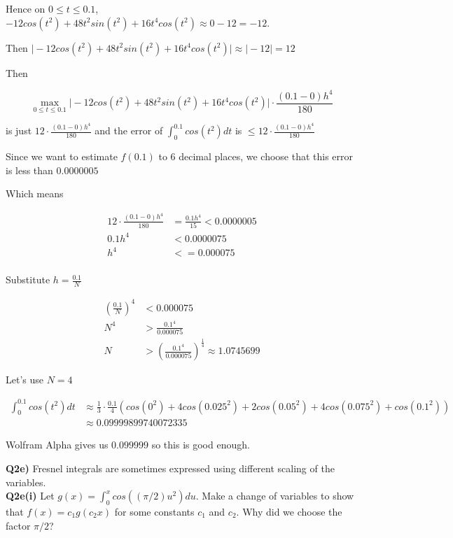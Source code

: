 \documentclass[9pt]{article}
\begin{document}
Hence on $0 \leq t \leq 0.1$, $-12cos(t^2) + 48t^2sin(t^2) + 16t^4cos(t^2) \approx 0 - 12 = -12$.

Then $\Big|-12cos(t^2) + 48t^2sin(t^2) + 16t^4cos(t^2) \Big| \approx \Big|-12\Big| = 12$

Then

\begin{equation*}
\max_{0 \leq t \leq 0.1} \Big| -12cos(t^2) + 48t^2sin(t^2) + 16t^4cos(t^2) \Big| \cdot \frac{(0.1 - 0)h^4}{180}
\end{equation*}

is just $12 \cdot \frac{(0.1 - 0)h^4}{180}$ and the error of $\int_0^{0.1} cos(t^2) dt$ is $\leq 12 \cdot \frac{(0.1 - 0)h^4}{180}$

Since we want to estimate $f(0.1)$ to 6 decimal places, we choose that this error is less than $0.0000005$

Which means

\begin{align*}
  12 \cdot \frac{(0.1 - 0)h^4}{180} &= \frac{0.1h^4}{15} < 0.0000005 \\
  0.1 h^4 &< 0.0000075 \\
  h^4 &<= 0.000075 \\
\end{align*}

Substitute $h = \frac{0.1}{N}$

\begin{align*}
  (\frac{0.1}{N})^4 &< 0.000075 \\
  N^4 &> \frac{0.1^4}{0.000075} \\
  N &> (\frac{0.1^4}{0.000075})^{\frac{1}{4}} \approx 1.0745699
\end{align*}

Let's use $N = 4$

\begin{align*}
  \int_{0}^{0.1} cos(t^2) dt &\approx \frac{1}{3} \cdot \frac{0.1}{4} (cos(0^2) + 4cos(0.025^2) + 2cos(0.05^2) + 4cos(0.075^2) + cos(0.1^2)) \\
  &\approx 0.09999899740072335
\end{align*}

Wolfram Alpha gives us $0.099999$ so this is good enough.


\begin{tcolorbox}
  \textbf{Q2e)} Fresnel integrals are sometimes expressed using different scaling of the variables.\\
  \textbf{Q2e(i)} Let $g(x) = \int_{0}^{x} cos((\pi/2)u^2) du$. Make a change of variables to show that $f(x) = c_1g(c_2 x)$ for some constants $c_1$ and $c_2$. Why did we choose the factor $\pi/2$?
\end{tcolorbox}
\end{document}
